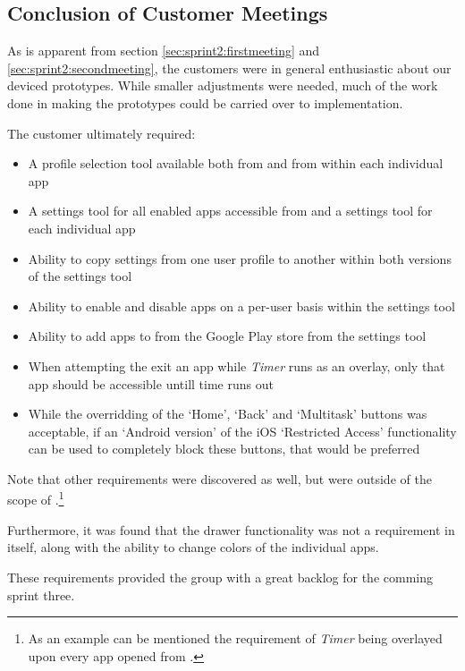 \subsection{Conclusion of Customer Meetings}\label{sec:sprint2:conclusionmeetings}

As is apparent from section \ref{sec:sprint2:firstmeeting} and \ref{sec:sprint2:secondmeeting}, the customers were in general enthusiastic about our deviced prototypes.
While smaller adjustments were needed, much of the work done in making the prototypes could be carried over to implementation.

The customer ultimately required:

\begin{itemize}
\item A profile selection tool available both from \launcher and from within each individual app
\item A settings tool for all enabled apps accessible from \launcher and a settings tool for each individual app
\item Ability to copy settings from one user profile to another within both versions of the settings tool
\item Ability to enable and disable apps on a per-user basis within the \launcher settings tool
\item Ability to add apps to \launcher from the Google Play store from the \launcher settings tool
\item When attempting the exit an app while \textit{Timer} runs as an overlay, only that app should be accessible untill time runs out
\item While the overridding of the `Home', `Back' and `Multitask' buttons was acceptable, if an `Android version' of the iOS `Restricted Access' functionality can be used to completely block these buttons, that would be preferred
\end{itemize}

Note that other requirements were discovered as well, but were outside of the scope of \launcher.\footnote{As an example can be mentioned the requirement of \textit{Timer} being overlayed upon every app opened from \launcher.}

Furthermore, it was found that the drawer functionality was not a requirement in itself, along with the ability to change colors of the individual apps.

These requirements provided the group with a great backlog for the comming sprint three.